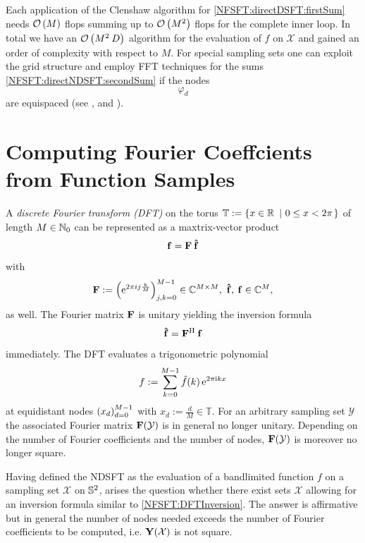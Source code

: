 Each application of the Clenshaw algorithm for \eqref{NFSFT:directDSFT:firstSum} needs $\mathcal{O}\left(M\right)$ 
flops summing up to $\mathcal{O}\left(M^2\right)$ flops for the complete inner loop. In 
total we have an $\mathcal{O}\left(M^2\:D\right)$ algorithm for the evaluation of $f$ on $\mathcal{X}$ and gained an order of complexity with respect to $M$. 
For special sampling sets one can exploit the grid 
structure and employ FFT techniques for the sums \eqref{NFSFT:directNDSFT:secondSum} if the nodes $$\varphi_{d}$$ are equispaced 
(see \cite{drhe}, \cite{postta97} and \cite{kupo02}). 


\section{Computing Fourier Coeffcients from Function Samples}
A \emph{discrete Fourier transform (DFT)} on the torus $\mathbb{T} := \left\{x \in \mathbb{R}\ \left|\ 0 \le x < 2\pi\right.\right\rbrace$ of length $M \in \mathbb{N}_{0}$ can be represented 
as a maxtrix-vector product
$$
  \mathbf{f} = \mathbf{F} \: \mathbf{\hat{f}}
$$
with
$$
 \mathbf{F} := \left(\mbox{\rm{e}}^{2 \pi i j \frac{k}{M}}\right)_{j,k = 0}^{M-1} \in \mathbb{C}^{M \times M},\ \mathbf{\hat{f}},\:\mathbf{f} \in \mathbb{C}^{M},
$$
as well. The Fourier matrix $\mathbf{F}$ is unitary yielding the inversion formula
\begin{equation}
  \label{NFSFT:DFTInversion}
  \mathbf{\hat{f}} = \mathbf{F}^{\text{\rm{H}}} \: \mathbf{f}
\end{equation}
immediately. The DFT evaluates a trigonometric polynomial 
$$
  f := \sum_{k=0}^{M-1} \hat{f}{\hspace{-0.4ex}}\left(k\right) \mbox{\rm{e}}^{2 \pi \mbox{\scriptsize\rm{i}} k x}
$$
at equidistant nodes $\left(x_{d}\right)_{d=0}^{M-1}$ with $x_{d} := \frac{d}{M} \in \mathbb{T}$. 
For an arbitrary sampling set $\mathcal{Y}$ the associated Fourier matrix $\mathbf{F}{\hspace{-0.4ex}}\left(\mathcal{Y}\right)$ is in general no longer unitary. 
Depending on the number of Fourier coefficients and the number of nodes,
$\mathbf{F}{\hspace{-0.4ex}}\left(\mathcal{Y}\right)$ is moreover no longer square.

Having defined the NDSFT as the evaluation of a bandlimited function $f$ on a sampling set $\mathcal{X}$ on $\mathbb{S}^2$, arises the question 
whether there exist sets $\mathcal{X}$ allowing for an inversion formula similar to \eqref{NFSFT:DFTInversion}.
The answer is affirmative but in general the number of nodes needed exceeds the number of Fourier coefficients to be computed, 
i.e. $\mathbf{Y}{\hspace{-0.4ex}}\left(\mathcal{X}\right)$ is not square.

